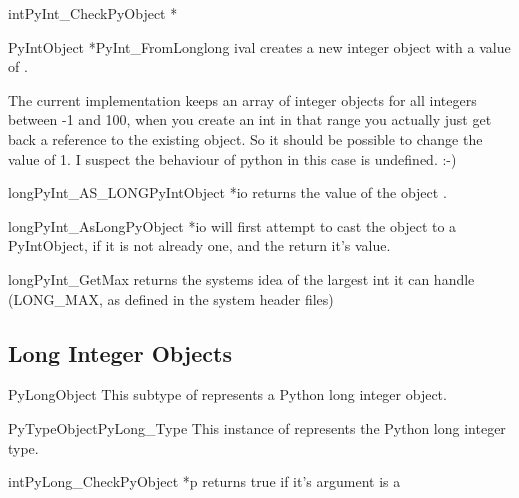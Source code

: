 \documentclass[twoside,openright]{report}
\begin{document}
\begin{cfuncdesc}{int}{PyInt_Check}{PyObject *}

\end{cfuncdesc}

\begin{cfuncdesc}{PyIntObject *}{PyInt_FromLong}{long ival}
creates a new integer object with a value of .

The current implementation keeps an array of integer objects for all
integers between -1 and 100, when you create an int in that range you
actually just get back a reference to the existing object. So it should
be possible to change the value of 1. I suspect the behaviour of python
in this case is undefined. :-)
\end{cfuncdesc}

\begin{cfuncdesc}{long}{PyInt_AS_LONG}{PyIntObject *io}
returns the value of the object .
\end{cfuncdesc}

\begin{cfuncdesc}{long}{PyInt_AsLong}{PyObject *io}
will first attempt to cast the object to a PyIntObject, if
it is not already one, and the return it's value.
\end{cfuncdesc}

\begin{cfuncdesc}{long}{PyInt_GetMax}{}
returns the systems idea of the largest int it can handle
(LONG_MAX, as defined in the system header files)
\end{cfuncdesc}


\subsection{Long Integer Objects}

\begin{ctypedesc}{PyLongObject}
This subtype of  represents a Python long integer object.
\end{ctypedesc}

\begin{cvardesc}{PyTypeObject}{PyLong_Type}
This instance of  represents the Python long integer type.
\end{cvardesc}

\begin{cfuncdesc}{int}{PyLong_Check}{PyObject *p}
returns true if it's argument is a 
\end{cfuncdesc}
\end{document}
